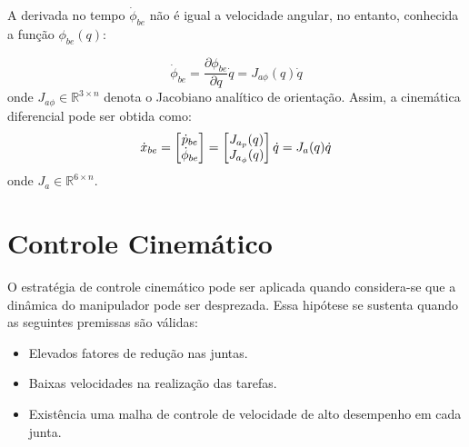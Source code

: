 A derivada no tempo $\dot{{\phi}}_{be}$ não é igual a velocidade angular, no entanto, conhecida a função ${\phi}_{be}({q})$:

\begin{equation} \label{eq:jacob_or}
\dot{{\phi}}_{be} = \frac{\partial {\phi}_{be}}{\partial {q}} {\dot{q}} = {J}_{a\phi}({q}){\dot{q}}
\end{equation}
onde ${J}_{a\phi}  \in \mathbb{R}^{3 \times n} $ denota o Jacobiano analítico de orientação. Assim, a cinemática diferencial pode ser obtida como:
\begin{equation} \label{eq:jacoba}
\dot{x}_{be} = \begin{bmatrix} \dot{p}_{be} \\ \dot{\phi}_{be} \end{bmatrix} = \begin{bmatrix} J_{a_p}(q) \\ J_{a_\phi}(q)\end{bmatrix} {\dot{q}} = {J}_a ({q}) \dot{{q}}
\end{equation}
onde ${J}_{a}  \in \mathbb{R}^{6 \times n} $.
 
\section{Controle Cinemático} \label{sec:controle_cinematico}
O estratégia de controle cinemático pode ser aplicada quando considera-se que a dinâmica do manipulador pode ser desprezada. Essa hipótese se sustenta quando as seguintes premissas são válidas:
\begin{itemize}
\item Elevados fatores de redução nas juntas.
\item Baixas velocidades na realização das tarefas.
\item Existência uma malha de controle de velocidade de alto desempenho em cada junta.
\end{itemize}

